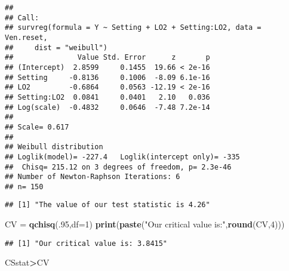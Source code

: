 \documentclass[]{article}
\newenvironment{Shaded}{\begin{snugshade}}{\end{snugshade}}
\newcommand{\CommentTok}[1]{\textcolor[rgb]{0.56,0.35,0.01}{\textit{#1}}}
\newcommand{\DataTypeTok}[1]{\textcolor[rgb]{0.13,0.29,0.53}{#1}}
\newcommand{\DecValTok}[1]{\textcolor[rgb]{0.00,0.00,0.81}{#1}}
\newcommand{\KeywordTok}[1]{\textcolor[rgb]{0.13,0.29,0.53}{\textbf{#1}}}
\newcommand{\NormalTok}[1]{#1}
\newcommand{\OperatorTok}[1]{\textcolor[rgb]{0.81,0.36,0.00}{\textbf{#1}}}
\newcommand{\StringTok}[1]{\textcolor[rgb]{0.31,0.60,0.02}{#1}}
\begin{document}
\begin{verbatim}
## 
## Call:
## survreg(formula = Y ~ Setting + LO2 + Setting:LO2, data = Ven.reset, 
##     dist = "weibull")
##               Value Std. Error      z       p
## (Intercept)  2.8599     0.1455  19.66 < 2e-16
## Setting     -0.8136     0.1006  -8.09 6.1e-16
## LO2         -0.6864     0.0563 -12.19 < 2e-16
## Setting:LO2  0.0841     0.0401   2.10   0.036
## Log(scale)  -0.4832     0.0646  -7.48 7.2e-14
## 
## Scale= 0.617 
## 
## Weibull distribution
## Loglik(model)= -227.4   Loglik(intercept only)= -335
##  Chisq= 215.12 on 3 degrees of freedom, p= 2.3e-46 
## Number of Newton-Raphson Iterations: 6 
## n= 150
\end{verbatim}

\begin{Shaded}
\end{Shaded}

\begin{verbatim}
## [1] "The value of our test statistic is 4.26"
\end{verbatim}

\begin{Shaded}
\begin{Highlighting}[]
\NormalTok{CV =}\StringTok{ }\KeywordTok{qchisq}\NormalTok{(.}\DecValTok{95}\NormalTok{,}\DataTypeTok{df=}\DecValTok{1}\NormalTok{)}
\KeywordTok{print}\NormalTok{(}\KeywordTok{paste}\NormalTok{(}\StringTok{"Our critical value is:"}\NormalTok{,}\KeywordTok{round}\NormalTok{(CV,}\DecValTok{4}\NormalTok{)))}
\end{Highlighting}
\end{Shaded}

\begin{verbatim}
## [1] "Our critical value is: 3.8415"
\end{verbatim}

\begin{Shaded}
\begin{Highlighting}[]
\NormalTok{CSstat}\OperatorTok{>}\NormalTok{CV}
\end{Highlighting}
\end{Shaded}
\end{document}
